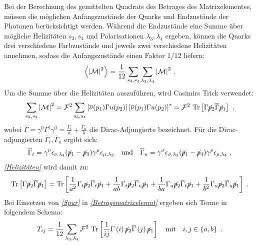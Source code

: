 Bei der Berechnung des gemittelten Quadrats des Betrages des Matrixelementes, müssen die möglichen Anfangszustände der Quarks und Endzustände der Photonen berücksichtigt werden. Während die Endzustände eine Summe über mögliche Helizitäten $s_3, s_4$ und Polarisationen $\lambda_3, \lambda_4$ ergeben, können die Quarks drei verschiedene Farbzustände und jeweils zwei verschiedene Helizitäten annehmen, sodass die Anfangszustände einen Faktor $1/12$ liefern:
\begin{equation}
\left\langle  \abs{\mathcal{M}}^2\right\rangle = \frac{1}{12} \sum_{s_3, s_4} \sum_{\lambda_3, \lambda_4} \abs{\mathcal{M}}^2~.
\label{Betragsmatrixelemnt}
\end{equation}
Um die Summe über die Helizitäten auszuführen, wird Casimirs Trick verwendet:
\begin{equation}
\sum_{s_3, s_4} \abs{\mathcal{M}}^2 = \mathcal{F}^2 \sum_{s_3, s_4}  \left[ \overline{\nu}(p_1) \Gamma u(p_2)\right] \left[\overline{\nu}(p_1) \Gamma u(p_2)\right]^* = \mathcal{F}^2~\text{Tr}\left[ \Gamma \cancel{p}_2 \overline{\Gamma} \cancel{p}_1 \right] ~,
\label{Helizitäten}
\end{equation}
wobei $\overline{\Gamma} = \gamma^0\Gamma^\dagger\gamma^0 = \frac{\overline{\Gamma}_t}{a} + \frac{\overline{\Gamma}_u}{b}$ die Dirac-Adjungierte bezeichnet. Für die Dirac-adjungierten $\overline{\Gamma}_t, \overline{\Gamma}_u$ ergibt sich:
\begin{equation}
\overline{\Gamma}_t = \gamma^\nu  \epsilon_{\nu, \lambda_4} (\cancel{p}_1- \cancel{p}_3)  \gamma^\mu \epsilon_{\mu, \lambda_3} \quad \text{und} \quad \overline{\Gamma}_u = \gamma^\sigma \epsilon_{\sigma, \lambda_3} (\cancel{p}_1- \cancel{p}_4)  \gamma^\rho \epsilon_{\rho, \lambda_4} ~.
\end{equation}
\textit{\autoref{Helizitäten}} wird damit zu:
\begin{equation}
\text{Tr}\left[ \Gamma \cancel{p}_2 \overline{\Gamma} \cancel{p}_1 \right] = \text{Tr}\left[\frac{1}{a^2} \Gamma_t \cancel{p}_2 \overline{\Gamma}_t \cancel{p}_1 + \frac{1}{ab} \Gamma_t \cancel{p}_2 \overline{\Gamma}_u \cancel{p}_1 + \frac{1}{ba} \Gamma_u \cancel{p}_2 \overline{\Gamma}_t \cancel{p}_1 + \frac{1}{b^2} \Gamma_u \cancel{p}_2 \overline{\Gamma}_u \cancel{p}_1\right]~.
\label{Spur}
\end{equation}
Bei Einsetzen von \textit{\autoref{Spur}} in \textit{\autoref{Betragsmatrixelemnt}} ergeben sich Terme in folgendem Schema:
\begin{equation}
T_{ij} = \frac{1}{12} \sum_{\lambda_3, \lambda_4} \mathcal{F}^2~\text{Tr}\left[ \frac{1}{ij} \Gamma\left(i\right) \cancel{p}_2 \overline{\Gamma}\left(j\right) \cancel{p}_1 \right] \quad \text{mit} \quad i,j \in \left\lbrace a,b\right\rbrace~.
\end{equation}
